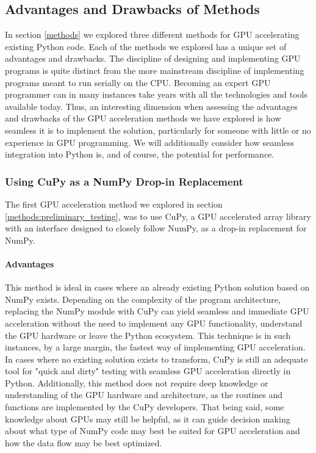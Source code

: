 \subsection{Advantages and Drawbacks of Methods} \label{discussion:advantages_and_drawbacks_of_methods}
In section \ref{methods} we explored three different methods for GPU accelerating existing Python code.
Each of the methods we explored has a unique set of advantages and drawbacks.
The discipline of designing and implementing GPU programs is quite distinct from the more mainstream discipline of implementing programs meant to run serially on the CPU.
Becoming an expert GPU programmer can in many instances take years with all the technologies and tools available today.
Thus, an interesting dimension when assessing the advantages and drawbacks of the GPU acceleration methods we have explored is how seamless it is to implement the solution, particularly for someone with little or no experience in GPU programming.
We will additionally consider how seamless integration into Python is, and of course, the potential for performance.

\subsubsection{Using CuPy as a NumPy Drop-in Replacement} \label{discussion:using_cupy_as_a_numpy_drop_in_replacement}
The first GPU acceleration method we explored in section \ref{methods:preliminary_testing}, was to use CuPy, a GPU accelerated array library with an interface designed to closely follow NumPy, as a drop-in replacement for NumPy. 

\paragraph{Advantages}
This method is ideal in cases where an already existing Python solution based on NumPy exists.
Depending on the complexity of the program architecture, replacing the NumPy module with CuPy can yield seamless and immediate GPU acceleration without the need to implement any GPU functionality, understand the GPU hardware or leave the Python ecosystem.
This technique is in such instances, by a large margin, the fastest way of implementing GPU acceleration.
In cases where no existing solution exists to transform, CuPy is still an adequate tool for "quick and dirty" testing with seamless GPU acceleration directly in Python.
Additionally, this method does not require deep knowledge or understanding of the GPU hardware and architecture, as the routines and functions are implemented by the CuPy developers.
That being said, some knowledge about GPUs may still be helpful, as it can guide decision making about what type of NumPy code may best be suited for GPU acceleration and how the data flow may be best optimized.

